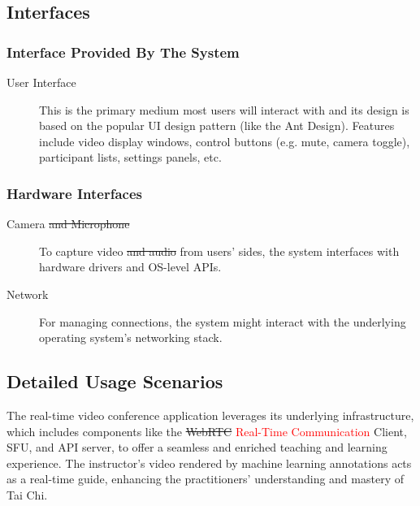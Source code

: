 \documentclass[12pt]{article}
\begin{document}
\subsection{Interfaces}
\subsubsection{Interface Provided By The System}
\begin{description}
    \item[User Interface] This is the primary medium most users will interact with and its design is based on the popular UI design pattern (like the Ant Design). Features include video display windows, control buttons (e.g. mute, camera toggle), participant lists, settings panels, etc.
\end{description}
\subsubsection{Hardware Interfaces}
\begin{description}
    \item[Camera \sout{and Microphone}] To capture video \sout{and audio} from users’ sides, the system interfaces with hardware drivers and OS-level APIs.
    \item[Network] For managing connections, the system might interact with the underlying operating system’s networking stack.
\end{description}
\subsection{Detailed Usage Scenarios}
The real-time video conference application leverages its underlying infrastructure, which includes components like the \sout{WebRTC} \textcolor{red}{Real-Time Communication} Client, SFU, and API server, to offer a seamless and enriched teaching and learning experience. The instructor's video rendered by machine learning annotations acts as a real-time guide, enhancing the practitioners' understanding and mastery of Tai Chi.
\end{document}
